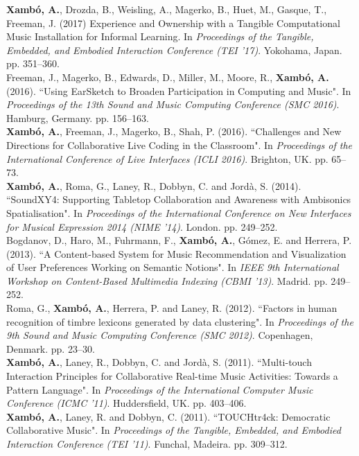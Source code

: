 \documentclass[10pt, a4paper]{article}
\newcommand{\years}[1]{\marginnote{\scriptsize #1}}
\begin{document}
\years{2017a}\textbf{Xambó, A.}, Drozda, B., Weisling, A., Magerko, B., Huet, M., Gasque, T., Freeman, J. (2017) Experience and Ownership with a Tangible Computational Music Installation for Informal Learning. In \emph{Proceedings of the Tangible, Embedded, and Embodied Interaction Conference (TEI '17)}. Yokohama, Japan. pp. 351--360.\\ 
\years{2016b}Freeman, J., Magerko, B., Edwards, D., Miller, M., Moore, R., \textbf{Xambó, A.} (2016). “Using EarSketch to Broaden Participation in Computing and Music". In \emph{Proceedings of the 13th Sound and Music Computing Conference (SMC 2016)}. Hamburg, Germany. pp. 156--163.\\
\years{2016a}\textbf{Xambó, A.}, Freeman, J., Magerko, B., Shah, P. (2016). “Challenges and New Directions for Collaborative Live Coding in the Classroom". In \emph{Proceedings of the International Conference of Live Interfaces (ICLI 2016)}. Brighton, UK. pp. 65--73.\\
\years{2014}\textbf{Xambó, A.}, Roma, G., Laney, R., Dobbyn, C. and Jordà, S. (2014). “SoundXY4: Supporting Tabletop Collaboration and Awareness with Ambisonics Spatialisation". In \emph{Proceedings of the International Conference on New Interfaces for Musical Expression 2014 (NIME '14)}. London. pp. 249--252.\\
\years{2013}Bogdanov, D., Haro, M., Fuhrmann, F., \textbf{Xambó, A.}, Gómez, E. and Herrera, P. (2013). “A Content-based System for Music Recommendation and Visualization of User Preferences Working on Semantic Notions". In \emph{IEEE 9th International Workshop on Content-Based Multimedia Indexing (CBMI '13)}. Madrid. pp. 249--252.\\
\years{2012}Roma, G., \textbf{Xambó, A.}, Herrera, P. and Laney, R. (2012). “Factors in human recognition of timbre lexicons generated by data clustering". In \emph{Proceedings of the 9th Sound and Music Computing Conference (SMC 2012)}. Copenhagen, Denmark. pp. 23--30.\\
\years{2011c}\textbf{Xambó, A.}, Laney, R., Dobbyn, C. and Jordà, S. (2011). “Multi-touch Interaction Principles for Collaborative Real-time Music Activities: Towards a Pattern Language". In \emph{Proceedings of the International Computer Music Conference (ICMC '11)}. Huddersfield, UK. pp. 403--406.\\
\years{2011b}\textbf{Xambó, A.}, Laney, R. and Dobbyn, C. (2011). “TOUCHtr4ck: Democratic Collaborative Music". In \emph{Proceedings of the Tangible, Embedded, and Embodied Interaction Conference (TEI '11)}. Funchal, Madeira. pp. 309--312.\\
\end{document}
